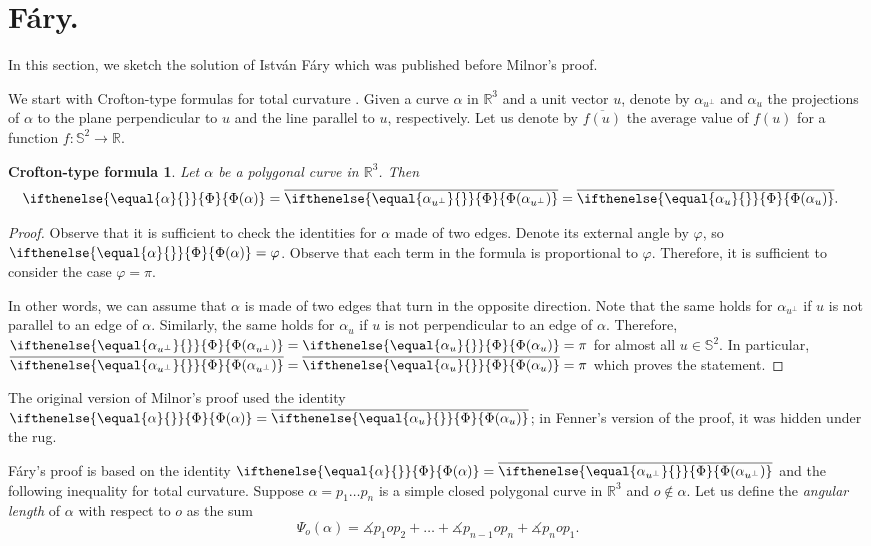 \documentclass{article}
\theoremstyle{theorem}
\newtheorem{Crofton-type formula}[theorem]{Crofton-type formula}
\newtheorem{Douglas--Rado theorem}[theorem]{\arXiv{Douglas--Rado theorem}{Theorem}}
\newtheorem{Extended monotonicity theorem}[theorem]{\arXiv{Extended monotonicity theorem}{Theorem}}
\theoremstyle{definition}
\newcommand*{\tc}[1]{\ifthenelse{\equal{#1}{}}{\Phi}{\Phi({#1})}}%
\def\phi{\varphi}
\begin{document}
\section{Fáry.}\label{sec:fary}

In this section, we sketch the solution of István Fáry \cite{fary} which was published before Milnor's proof.

We start with Crofton-type formulas for total curvature \cite[Proposition 4.1]{sullivan-curves}.
Given a curve $\alpha$ in $\mathbb{R}^3$ and a unit vector $u$, denote by $\alpha_{u^\perp}$ 
and $\alpha_u$ the projections of $\alpha$ to the plane perpendicular to $u$ and the line parallel to $u$, respectively.
Let us denote by $\overline{f(u)}$ the average value of $f(u)$ for a function $f\colon\mathbb{S}^2\to\mathbb{R}$.

\begin{Crofton-type formula}\label{prop:tc-crofton}
Let $\alpha$ be a polygonal curve in $\mathbb{R}^3$.
Then
\begin{align*}
\tc\alpha
&=\overline{\tc{\alpha_{u^\perp}}}
=\overline{\tc{\alpha_u}}.
\end{align*}
\end{Crofton-type formula}


\begin{proof}
Observe that it is sufficient to check the identities for $\alpha$ made of two edges.
Denote its external angle by $\phi$, so $\tc\alpha=\phi$.
Observe that each term in the formula is proportional to $\phi$.
Therefore, it is sufficient to consider the case $\phi=\pi$.

In other words, we can assume that $\alpha$ is made of two edges that turn in the opposite direction.
Note that the same holds for $\alpha_{u^\perp}$ if $u$ is not parallel to an edge of $\alpha$.
Similarly, the same holds for $\alpha_u$ if $u$ is not perpendicular to an edge of $\alpha$.
Therefore, $\tc{\alpha_{u^\perp}}=\tc{\alpha_u}=\pi$ for almost all $u\in\mathbb{S}^2$.
In particular, $\overline{\tc{\alpha_{u^\perp}}}=\overline{\tc{\alpha_u}}=\pi$ which proves the statement.
\end{proof}

The original version of Milnor's proof 
used the identity $\tc\alpha=\overline{\tc{\alpha_u}}$;
in Fenner's version of the proof, it was hidden under the rug.

Fáry's proof is based on the identity $\tc\alpha=\overline{\tc{\alpha_{u^\perp}}}$ and the following inequality for total curvature.
Suppose $\alpha=p_1\dots p_n$ is a simple closed polygonal curve in $\mathbb{R}^3$ and $o\notin\alpha$.
Let us define the \emph{angular length} of $\alpha$ with respect to $o$ as the sum
\[\Psi_o(\alpha)=\measuredangle p_{1} o p_{2}+\dots+\measuredangle p_{n-1} o p_{n}+\measuredangle p_{n} o p_{1}.\]
\end{document}
